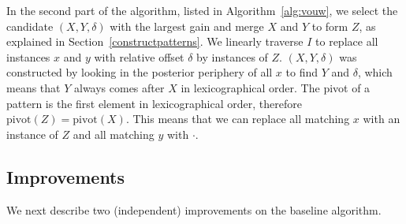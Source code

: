 \documentclass{llncs}
\begin{document}
In the second part of the algorithm, listed in Algorithm~\ref{alg:vouw}, we select the candidate $(X,Y,\delta)$ with the largest gain and merge $X$ and $Y$ to form $Z$, as explained in Section~\ref{constructpatterns}. We linearly traverse $I$ to replace all instances $x$ and $y$ with relative offset $\delta$  by instances of $Z$. $(X,Y,\delta)$ was constructed by looking in the posterior periphery of all $x$ to find $Y$ and $\delta$, which means that $Y$ always comes after $X$ in lexicographical order. The pivot of a pattern is the first element in lexicographical order, therefore $\mathrm{pivot}(Z) = \mathrm{pivot}(X)$. This means that we can replace all matching $x$ with an instance of $Z$ and all matching $y$ with $\cdot$. %

\subsection{Improvements}
\label{improvements}

We next describe two (independent) improvements on the baseline algorithm. 
\end{document}

